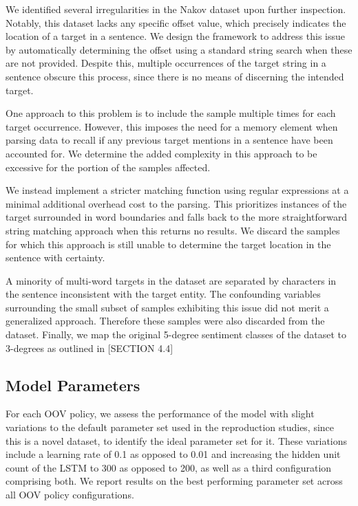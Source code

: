 \documentclass[../../fyp.tex]{subfiles}
\begin{document}
We identified several irregularities in the Nakov dataset upon further inspection. Notably, this dataset lacks any specific offset value, which precisely indicates the location of a target in a sentence. We design the framework to address this issue by automatically determining the offset using a standard string search when these are not provided. Despite this, multiple occurrences of the target string in a sentence obscure this process, since there is no means of discerning the intended target.

One approach to this problem is to include the sample multiple times for each target occurrence. However, this imposes the need for a memory element when parsing data to recall if any previous target mentions in a sentence have been accounted for. We determine the added complexity in this approach to be excessive for the portion of the samples affected. 

We instead implement a stricter matching function using regular expressions at a minimal additional overhead cost to the parsing. This prioritizes instances of the target surrounded in word boundaries and falls back to the more straightforward string matching approach when this returns no results. We discard the samples for which this approach is still unable to determine the target location in the sentence with certainty. 

A minority of multi-word targets in the dataset are separated by characters in the sentence inconsistent with the target entity. The confounding variables surrounding the small subset of samples exhibiting this issue did not merit a generalized approach. Therefore these samples were also discarded from the dataset. Finally, we map the original 5-degree sentiment classes of the dataset to 3-degrees as outlined in [SECTION 4.4]

\subsection{Model Parameters}
For each OOV policy, we assess the performance of the model with slight variations to the default parameter set used in the reproduction studies, since this is a novel dataset, to identify the ideal parameter set for it. These variations include a learning rate of 0.1 as opposed to 0.01 and increasing the hidden unit count of the LSTM to 300 as opposed to 200, as well as a third configuration comprising both. We report results on the best performing parameter set across all OOV policy configurations. 
\end{document}
